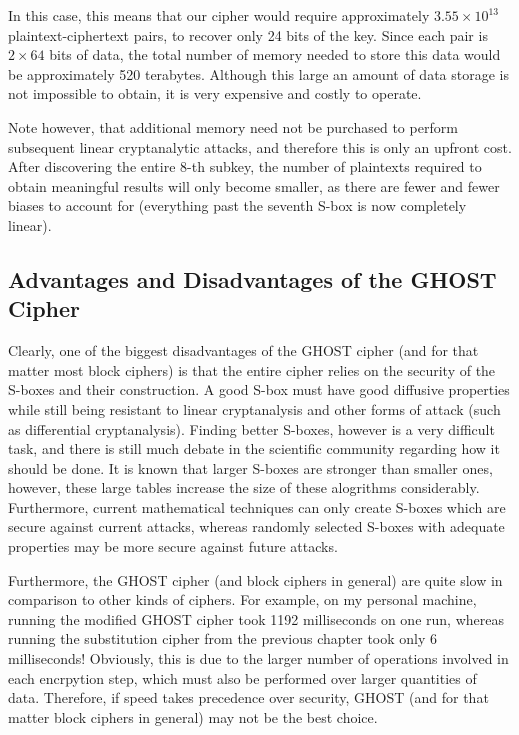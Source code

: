 \documentclass[12pt, a4paper, final]{report}
\begin{document}
In this case, this means that our cipher would require approximately $3.55 \times
10^{13}$ plaintext-ciphertext pairs, to recover only 24 bits of the key. Since
each pair is $2 \times 64$ bits of data, the total number of memory needed to
store this data would be approximately 520 terabytes. Although this large an
amount of data storage is not impossible to obtain, it is very expensive and
costly to operate.

Note however, that additional memory need not be purchased to perform subsequent
linear cryptanalytic attacks, and therefore this is only an upfront cost. After
discovering the entire 8-th subkey, the number of plaintexts required to obtain
meaningful results will only become smaller, as there are fewer and fewer biases
to account for (everything past the seventh S-box is now completely linear).

\subsection{Advantages and Disadvantages of the GHOST Cipher}

Clearly, one of the biggest disadvantages of the GHOST cipher (and for that
matter most block ciphers) is that the entire cipher relies on the security of
the S-boxes and their construction. A good S-box must have good diffusive
properties while still being resistant to linear cryptanalysis and other forms
of attack (such as differential cryptanalysis). Finding better S-boxes,
however is a very difficult task, and there is still much debate in the scientific
community regarding how it should be done. It is known that larger S-boxes are
stronger than smaller ones, however, these large tables increase the size of these
alogrithms considerably. Furthermore, current mathematical techniques can only
create S-boxes which are secure against current attacks, whereas randomly selected
S-boxes with adequate properties may be more secure against future attacks.

Furthermore, the GHOST cipher (and block ciphers in general) are quite slow in
comparison to other kinds of ciphers. For example, on my personal machine,
running the modified GHOST cipher took 1192 milliseconds on one run, whereas
running the substitution cipher from the previous chapter took only 6
milliseconds! Obviously, this is due to the larger number of operations involved
in each encrpytion step, which must also be performed over larger quantities of
data. Therefore, if speed takes precedence over security, GHOST (and for
that matter block ciphers in general) may not be the best choice.
\end{document}
